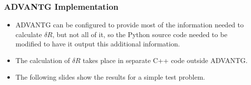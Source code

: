 \documentclass[t]{beamer}
\begin{document}
\begin{frame}
  \frametitle{ADVANTG Implementation}
  \begin{itemize}
    \item ADVANTG can be configured to provide most of the information needed to
          calculate $\delta R$, but not all of it, so the Python source code
          needed to be modified to have it output this additional information.
    \item The calculation of $\delta R$ takes place in separate C++ code outside
          ADVANTG.
    \item The following slides show the results for a simple test problem.
  \end{itemize}
\end{frame}

\end{document}
